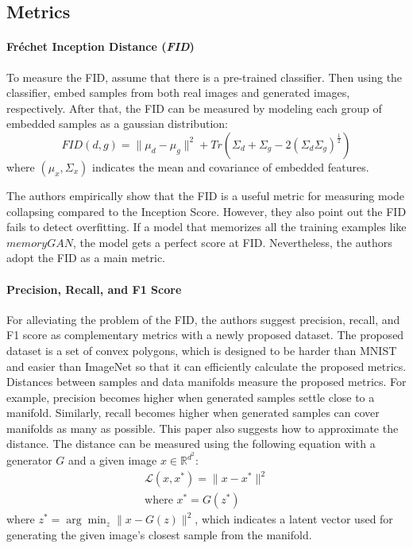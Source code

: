 \documentclass[10pt,twocolumn,letterpaper]{article}
\begin{document}
\subsection{Metrics}
\vspace{-0.2cm}
\paragraph{Fréchet Inception Distance (\textit{FID})}
To measure the FID, assume that there is a pre-trained classifier. Then using the classifier, embed samples from both real images and generated images, respectively. After that, the FID can be measured by modeling each group of embedded samples as a gaussian distribution:
\begin{equation}
FID(d, g) = \|\mu_d - \mu_g\|^2 + Tr(\Sigma_d + \Sigma_g - 2(\Sigma_d\Sigma_g)^{\frac{1}{2}})
\end{equation}
where $(\mu_x, \Sigma_x)$ indicates the mean and covariance of embedded features. 

The authors empirically show that the FID is a useful metric for measuring mode collapsing compared to the Inception Score. However, they also point out the FID fails to detect overfitting. If a model that memorizes all the training examples like $memory GAN$, the model gets a perfect score at FID. Nevertheless, the authors adopt the FID as a main metric.
\vspace{-0.2cm}
\vspace{-0.2cm}
\paragraph{Precision, Recall, and F1 Score}
For alleviating the problem of the FID, the authors suggest precision, recall, and F1 score as complementary metrics with a newly proposed dataset. The proposed dataset is a set of convex polygons, which is designed to be harder than MNIST and easier than ImageNet so that it can efficiently calculate the proposed metrics. Distances between samples and data manifolds measure the proposed metrics. For example, precision becomes higher when generated samples settle close to a manifold. Similarly, recall becomes higher when generated samples can cover manifolds as many as possible. This paper also suggests how to approximate the distance. The distance can be measured using the following equation with a generator $G$ and a given image $x \in \mathbb{R}^{d^2}$:
\begin{align}
\mathcal{L}(x, x^*) = \|x - x^*\|^2 \\
\text{where $x^* = G(z^*)$} 
\end{align}
where $z^* = \arg\min_{z}\|x-G(z)\|^2$, which indicates a latent vector used for generating the given image's closest sample from the manifold.
\end{document}
